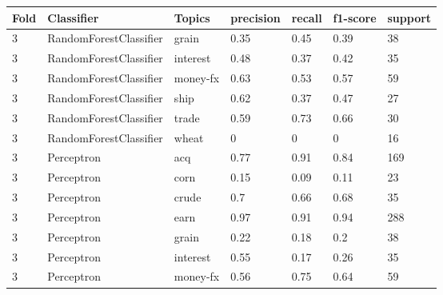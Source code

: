 \documentclass{article}
\begin{document}
\begin{table}[h]
\begin{tabular}{lllllll}
\textbf{Fold} & \textbf{Classifier}    & \textbf{Topics} & \textbf{precision} & \textbf{recall} & \textbf{f1-score} & \textbf{support} \\ \hline
3             & RandomForestClassifier & grain           & 0.35               & 0.45            & 0.39              & 38               \\
3             & RandomForestClassifier & interest        & 0.48               & 0.37            & 0.42              & 35               \\
3             & RandomForestClassifier & money-fx        & 0.63               & 0.53            & 0.57              & 59               \\
3             & RandomForestClassifier & ship            & 0.62               & 0.37            & 0.47              & 27               \\
3             & RandomForestClassifier & trade           & 0.59               & 0.73            & 0.66              & 30               \\
3             & RandomForestClassifier & wheat           & 0                  & 0               & 0                 & 16               \\
3             & Perceptron             & acq             & 0.77               & 0.91            & 0.84              & 169              \\
3             & Perceptron             & corn            & 0.15               & 0.09            & 0.11              & 23               \\
3             & Perceptron             & crude           & 0.7                & 0.66            & 0.68              & 35               \\
3             & Perceptron             & earn            & 0.97               & 0.91            & 0.94              & 288              \\
3             & Perceptron             & grain           & 0.22               & 0.18            & 0.2               & 38               \\
3             & Perceptron             & interest        & 0.55               & 0.17            & 0.26              & 35               \\
3             & Perceptron             & money-fx        & 0.56               & 0.75            & 0.64              & 59               \\

\end{tabular}
\end{table}
\end{document}
